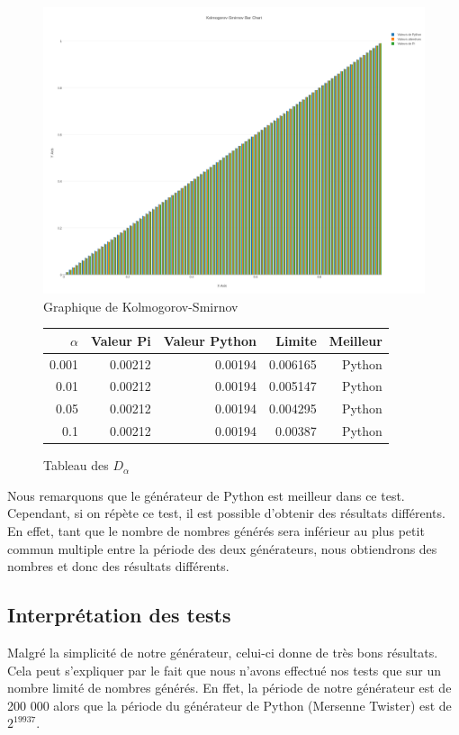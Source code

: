 \documentclass[10pt,a4paper]{article}
\begin{document}
	\begin{figure}[h]
		\centering
		\includegraphics[scale=0.25]{../chart_images/kolmogorov-smirnov_bar_chart.png}
		\caption{Graphique de Kolmogorov-Smirnov}
	\end{figure}
	
	\begin{figure}[h]
		\centering
		\begin{tabular}{|r|r|r|r|r|}
			\hline
			$\alpha$ & Valeur Pi & Valeur Python & Limite & Meilleur\\
			\hline
			0.001 & 0.00212 & 0.00194 & 0.006165 & Python\\
			0.01 & 0.00212 & 0.00194 & 0.005147 & Python\\
			0.05 & 0.00212 & 0.00194 & 0.004295 & Python\\
			0.1 & 0.00212 & 0.00194 & 0.00387 & Python\\
			\hline
		\end{tabular}
		\caption{Tableau des $D_\alpha$}
	\end{figure}
	
	\newpage
	Nous remarquons que le générateur de Python est meilleur dans ce test.
	Cependant, si on répète ce test, il est possible d'obtenir des résultats différents.
	En effet, tant que le nombre de nombres générés sera inférieur au plus petit commun multiple entre la période des deux générateurs, nous obtiendrons des nombres et donc des résultats différents.
	
	\newpage
	\subsection{Interprétation des tests}
	Malgré la simplicité de notre générateur, celui-ci donne de très bons résultats.
	Cela peut s'expliquer par le fait que nous n'avons effectué nos tests que sur un nombre limité de nombres générés. En 
	ffet, la période de notre générateur est de 200 000 alors que la période du générateur de Python (Mersenne Twister) est de $2^{19937}$.
	
\end{document}
